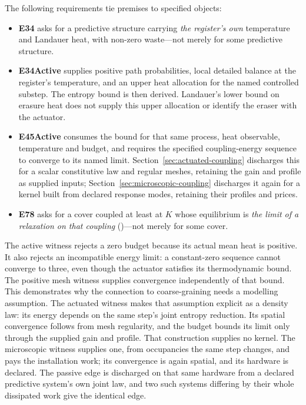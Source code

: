 \documentclass[11pt]{article}
\newcommand{\id}[1]{{\small\ttfamily\seqsplit{#1}}}
\begin{document}
The following requirements tie premises to specified objects:
\begin{itemize}[leftmargin=*,noitemsep]
\item \textbf{E34} asks for a predictive structure carrying \emph{the
register's own} temperature and Landauer heat, with non-zero waste---not merely
for some predictive structure.
\item \textbf{E34Active} supplies positive path probabilities, local detailed
balance at the register's temperature, and an upper heat allocation for the
named controlled substep. The entropy bound is then derived. Landauer's lower
bound on erasure heat does not supply this upper allocation or identify the
eraser with the actuator.
\item \textbf{E45Active} consumes the bound for that same process, heat
observable, temperature and budget, and requires the specified coupling-energy
sequence to converge to its named limit. Section~\ref{sec:actuated-coupling}
discharges this for a scalar constitutive law and regular meshes, retaining
the gain and profile as supplied inputs;
Section~\ref{sec:microscopic-coupling} discharges it again for a kernel built
from declared response modes, retaining their profiles and prices.
\item \textbf{E78} asks for a cover coupled at least at $K$ whose equilibrium
is \emph{the limit of a relaxation on that coupling}
(\id{ThermodynamicCover.IsReachedByRelaxation})---not merely for some cover.
\end{itemize}

The active witness rejects a zero budget because its actual mean heat is
positive. It also rejects an incompatible energy limit: a constant-zero
sequence cannot converge to three, even though the actuator satisfies its
thermodynamic bound. The positive mesh witness supplies convergence
independently of that bound. This demonstrates why the connection to
coarse-graining needs a modelling assumption. The actuated witness makes
that assumption explicit as a density law: its energy depends on the same
step's joint entropy reduction. Its spatial convergence follows from mesh
regularity, and the budget bounds its limit only through the supplied gain
and profile. That construction supplies no kernel. The microscopic witness
supplies one, from occupancies the same step changes, and pays the
installation work; its convergence is again spatial, and its hardware is
declared. The passive edge is discharged on that same hardware from a declared
predictive system's own joint law, and two such systems differing by their
whole dissipated work give the identical edge.
\end{document}
